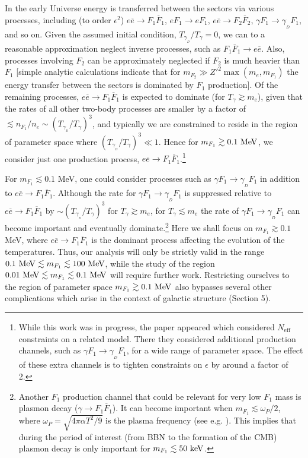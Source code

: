 \documentclass[12pt]{article}
\begin{document}
In the early Universe energy is transferred between the sectors via
various processes, including (to order $\epsilon ^2$) $e \overline{e}
\rightarrow F _1 \overline{F} _1$, $eF_1 \rightarrow eF_1$, $e
\overline{e} \rightarrow F _2 \overline{F} _2$, $\gamma F_1 \rightarrow
\gamma _{_D}F _1$, and so on. Given the assumed initial condition, $T
_{\gamma _{_D}}/T _{\gamma} = 0$, we can to a reasonable approximation
neglect inverse processes, such as $F_1\overline{F}_1 \rightarrow
e\overline{e}$. 
Also, processes involving $F_2$ can be approximately neglected if $F_2$
is much heavier than $F_1$ [simple analytic calculations indicate that
for $m _{F_2} \gg {Z'} ^2\max (m _e , m _{F_1})$ the energy transfer
between the sectors is dominated by $F_1$ production]. Of the remaining
processes, $e \overline{e} \rightarrow F _1 \overline{F} _1$ is expected
to dominate (for $T _{\gamma} \gtrsim m _e$), given that the rates of
all other two-body processes are smaller by a factor of $\lesssim n
_{F_1}/n _e \sim (T _{\gamma _{_D}}/T _{\gamma}) ^3$, and typically we
are constrained to reside in the region of parameter space where $(T
_{\gamma _{_D}}/T _{\gamma}) ^3 \ll 1$. Hence for $m _{F_1} \gtrsim 0.1
\ {\rm MeV}$, we consider just one production process, $e\overline{e}
\rightarrow F_1\overline{F}_1$.\footnote{While this work was in
progress, the paper \cite{redondo} appeared which considered
$N_{\text{eff}}$ constraints on a related model. There they considered
additional production channels, such as $\gamma F_1 \rightarrow
\gamma_{_D} F_1$, for a wide range of parameter space. The effect of
these extra channels is to tighten constraints on $\epsilon$ by around a
factor of 2.}

For $m _{F_1} \lesssim 0.1$ MeV, one could consider  processes such as
$\gamma F _1 \rightarrow \gamma _{_D}F _1$ in addition to $e\overline{e}
\rightarrow F _1\overline{F} _1$. Although the rate for $\gamma F_1
\rightarrow \gamma _{_D}F _1$ is suppressed relative to $e\overline{e}
\rightarrow F_1 \overline{F} _1$ by $\sim \left ( T _{\gamma _{_D}}/T
_{\gamma} \right ) ^3$ for $T _{\gamma} \gtrsim m _e$, for $T _{\gamma}
\lesssim m _e$ the rate of $\gamma F_1 \rightarrow \gamma _{_D}F _1$ can
become important and eventually dominate.\footnote{Another $F_1$
production channel that could be relevant for very low $F_1$ mass is
plasmon decay ($\gamma \rightarrow F _1\overline{F} _1$). It can become
important when $m _{F_1} \lesssim \omega _P/2$, where $\omega _P =
\sqrt{4\pi\alpha T ^2/9}$ is the plasma frequency (see e.g.
\cite{updated}). This implies that during the period of interest (from
BBN to the formation of the CMB) plasmon decay is only important for $m
_{F_1} \lesssim 50 \ {\rm keV}$.} Here we shall focus on $m _{F_1}
\gtrsim 0.1$ MeV, where $e\overline{e} \rightarrow F _1\overline{F} _1$
is the dominant process affecting the evolution of the temperatures.
Thus, our analysis will only be strictly valid in the range $0.1 \ {\rm
MeV} \lesssim m _{F_1} \lesssim 100 \ {\rm MeV}$, while the study of the
region $0.01 \ {\rm MeV} \lesssim m _{F_1} \lesssim 0.1 \ {\rm MeV}$
will require further work. Restricting ourselves to the region of
parameter space $m _{F_1} \gtrsim 0.1 \ {\rm MeV}$ also bypasses several
other complications which arise in the context of galactic structure
(Section 5).
\end{document}
